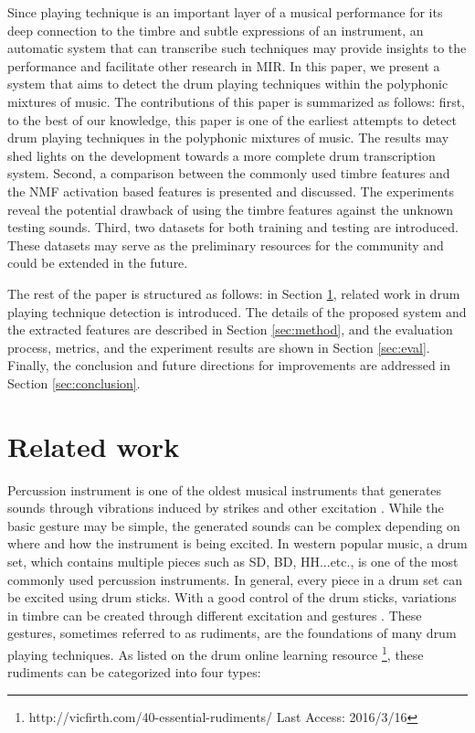 \documentclass{article}
\begin{document}
Since playing technique is an important layer of a musical performance for its deep connection to the timbre and subtle expressions of an instrument, an automatic system that can transcribe such techniques may provide insights to the performance and facilitate other research in MIR. In this paper, we present a system that aims to detect the drum playing techniques within the polyphonic mixtures of music. The contributions of this paper is summarized as follows: first, to the best of our knowledge, this paper is one of the earliest attempts to detect drum playing techniques in the polyphonic mixtures of music. The results may shed lights on the   development towards a more complete drum transcription system. Second, a comparison between the commonly used timbre features and the NMF activation based features is presented and discussed. The experiments reveal the potential drawback of using the timbre features against the unknown testing sounds. Third, two datasets for both training and testing are introduced. These datasets may serve as the preliminary resources for the community and could be extended in the future.

The rest of the paper is structured as follows: in Section \ref{sec:related_work}, related work in drum playing technique detection is introduced. The details of the proposed system and the extracted features are described in Section \ref{sec:method}, and the evaluation process, metrics, and the experiment results are shown in Section \ref{sec:eval}. Finally, the conclusion and future directions for improvements are addressed in Section \ref{sec:conclusion}. 


%
\section{Related work}\label{sec:related_work}
Percussion instrument is one of the oldest musical instruments that generates sounds through vibrations induced by strikes and other excitation \cite{Rossing2001}. While the basic gesture may be simple, the generated sounds can be complex depending on where and how the instrument is being excited. In western popular music, a drum set, which contains multiple pieces such as SD, BD, HH...etc., is one of the most commonly used percussion instruments. In general, every piece in a drum set can be excited using drum sticks. With a good control of the drum sticks, variations in timbre can be created through different excitation and gestures \cite{Stone2009}. These gestures, sometimes referred to as rudiments, are the foundations of many drum playing techniques. As listed on the drum online learning resource \footnote{http://vicfirth.com/40-essential-rudiments/ Last Access: 2016/3/16}, these rudiments can be categorized into four types: 
\end{document}
